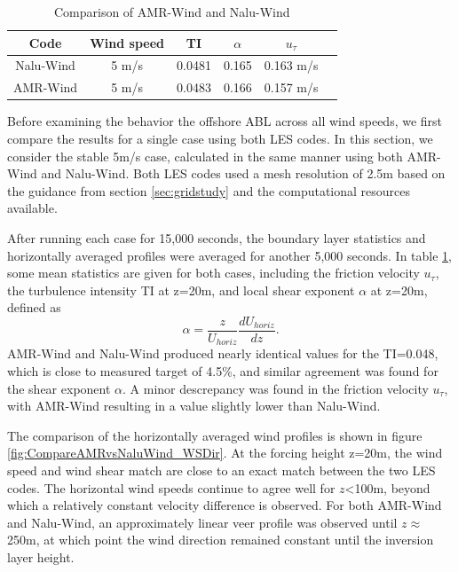 \begin{table}
\caption{\label{tab:CompareAMRvsNalu} Comparison of AMR-Wind and
  Nalu-Wind} \centering
\begin{tabular}{cccccc}
  \hline
  Code & Wind speed & TI      &  $\alpha$  &   $u_\tau$ \\ %
  \hline
  Nalu-Wind & 5 m/s &  0.0481 &  0.165     &  0.163 m/s \\ %
  AMR-Wind  & 5 m/s &  0.0483 &  0.166     &  0.157 m/s \\ %
  \hline
\end{tabular}
\end{table}

Before examining the behavior the offshore ABL across all wind speeds,
we first compare the results for a single case using both LES codes.
In this section, we consider the stable 5m/s case, calculated in the
same manner using both AMR-Wind and Nalu-Wind.  Both LES codes used a
mesh resolution of 2.5m based on the guidance from section
\ref{sec:gridstudy} and the computational resources available.

After running each case for 15,000 seconds, the boundary layer
statistics and horizontally averaged profiles were averaged for
another 5,000 seconds.  In table \ref{tab:CompareAMRvsNalu}, some mean
statistics are given for both cases, including the friction velocity
$u_\tau$, the turbulence intensity TI at z=20m, and local shear
exponent $\alpha$ at z=20m, defined as
$$ \alpha = \frac{z}{U_{horiz}} \frac{d U_{horiz}}{dz}.
$$ AMR-Wind and Nalu-Wind produced nearly identical values for the
TI=0.048, which is close to measured target of 4.5\%, and similar
agreement was found for the shear exponent $\alpha$.  A minor
descrepancy was found in the friction velocity $u_\tau$, with AMR-Wind
resulting in a value slightly lower than Nalu-Wind.

The comparison of the horizontally averaged wind profiles is shown in
figure \ref{fig:CompareAMRvsNaluWind_WSDir}.  At the forcing height
z=20m, the wind speed and wind shear match are close to an exact match
between the two LES codes.  The horizontal wind speeds continue to
agree well for $z$<100m, beyond which a relatively constant velocity
difference is observed.   For both AMR-Wind and Nalu-Wind, an
approximately linear veer profile was observed until $z\approx$ 250m,
at which point the wind direction remained constant until the
inversion layer height.

